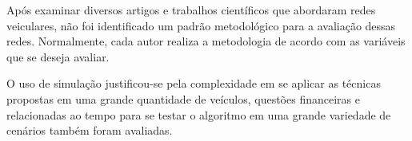 
\label{sec:metodologiaSimulacao}

Após examinar diversos artigos e trabalhos científicos que abordaram redes veiculares, não foi identificado um padrão metodológico para a avaliação dessas redes. Normalmente, cada autor realiza a metodologia de acordo com as variáveis que se deseja avaliar. 

O uso de simulação justificou-se pela complexidade em se aplicar as técnicas propostas em uma grande quantidade de veículos, questões financeiras e relacionadas ao tempo para se testar o algoritmo em uma grande variedade de cenários também foram avaliadas.







